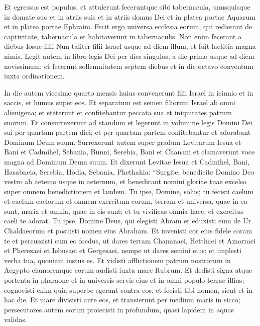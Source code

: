 \begin{biblechapter}
\verse Et egressus est populus, et attulerunt feceruntque sibi tabernacula, unusquisque in domate suo et in atriis suis et in atriis domus Dei et in platea portae Aquarum et in platea portae Ephraim. 
\verse Fecit ergo universa ecclesia eorum, qui redierant de captivitate, tabernacula et habitaverunt in tabernaculis. Non enim fecerant a diebus Iosue filii Nun taliter filii Israel usque ad diem illum; et fuit laetitia magna nimis. 
\verse Legit autem in libro legis Dei per dies singulos, a die primo usque ad diem novissimum; et fecerunt sollemnitatem septem diebus et in die octavo conventum iuxta ordinationem. 
\end{biblechapter}

\begin{biblechapter}  
\verse In die autem vicesimo quarto mensis huius convenerunt filii Israel in ieiunio et in saccis, et humus super eos. 
\verse Et separatum est semen filiorum Israel ab omni alienigena; et steterunt et confitebantur peccata sua et iniquitates patrum suorum. 
\verse Et consurrexerunt ad standum et legerunt in volumine legis Domini Dei sui per quartam partem diei; et per quartam partem confitebantur et adorabant Dominum Deum suum. 
\verse Surrexerunt autem super gradum Levitarum Iesua et Bani et Cadmihel, Sebania, Bunni, Serebia, Bani et Chanani et clamaverunt voce magna ad Dominum Deum suum. 
\verse Et dixerunt Levitae Iesua et Cadmihel, Bani, Hasabneia, Serebia, Hodia, Sebania, Phethahia: “Surgite, benedicite Domino Deo vestro ab aetemo usque in aeternum, et benedicant nomini gloriae tuae excelso super omnem benedictionem et laudem. 
\verse Tu ipse, Domine, solus; tu fecisti caelum et caelum caelorum et omnem exercitum eorum, terram et universa, quae in ea sunt, maria et omnia, quae in eis sunt; et tu vivificas omnia haec, et exercitus caeli te adorat. 
\verse Tu ipse, Domine Deus, qui elegisti Abram et eduxisti eum de Ur Chaldaeorum et posuisti nomen eius Abraham. 
\verse Et invenisti cor eius fidele coram te et percussisti cum eo foedus, ut dares terram Chananaei, Hetthaei et Amorraei et Pherezaei et Iebusaei et Gergesaei, nempe ut dares semini eius; et implesti verba tua, quoniam iustus es. 
\verse Et vidisti afflictionem patrum nostrorum in Aegypto clamoremque eorum audisti iuxta mare Rubrum. 
\verse Et dedisti signa atque portenta in pharaone et in universis servis eius et in omni populo terrae illius; cognovisti enim quia superbe egerant contra eos, et fecisti tibi nomen, sicut et in hac die. 
\verse Et mare divisisti ante eos, et transierunt per medium maris in sicco; persecutores autem eorum proiecisti in profundum, quasi lapidem in aquas validas. 

\end{biblechapter}
